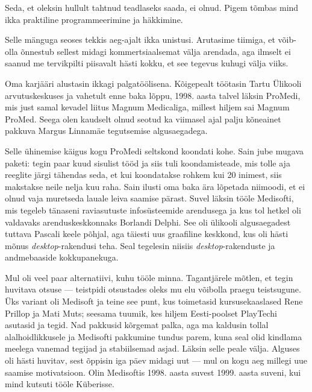 
Seda, et oleksin hullult tahtnud teadlaseks saada, ei olnud. Pigem tõmbas mind ikka
praktiline programmeerimine ja häkkimine. 


Selle mänguga seoses tekkis aeg-ajalt ikka unistusi. Arutasime tiimiga, et võib-olla õnnestub sellest midagi kommertsiaalsemat 
välja arendada, 
aga ilmselt ei saanud me tervikpilti piisavalt hästi 
kokku, et see tegevus kuhugi välja 
viiks. 

Oma karjääri alustasin ikkagi palgatöölisena. Kõigepealt töötasin Tartu Ülikooli arvutuskeskuses ja
vahetult enne baka lõppu, 1998. aasta talvel läksin
ProMedi, mis just samal kevadel liitus Magnum 
Medicaliga, millest hiljem sai Magnum ProMed. Seega
olen kaudselt olnud seotud ka viimasel ajal palju kõneainet pakkuva 
Margus Linnamäe tegutsemise algusaegadega. 

Selle ühinemise käigus kogu ProMedi seltskond koondati kohe. 
Sain jube mugava paketi: tegin paar kuud sisulist tööd ja siis tuli 
koondamisteade, mis tolle aja reeglite järgi tähendas seda, et kui koondatakse 
rohkem kui 20 inimest, siis makstakse neile nelja kuu raha. Sain ilusti 
oma baka ära lõpetada niimoodi, et ei olnud vaja 
muretseda lauale leiva saamise pärast. Suvel läksin tööle
Medisofti, mis tegeleb tänaseni raviasutuste 
infosüsteemide arendusega ja kus tol hetkel oli valdavaks arenduskeskkonnaks 
Borlandi Delphi. See oli ülikooli algusaegadest 
tuttava Pascali keele põhjal, aga täiesti uus graafiline keskkond, kus oli hästi mõnus 
\emph{desktop}-rakendusi teha. Seal tegelesin niisiis
\emph{desktop}-rakenduste ja andmebaaside kokkupanekuga. 

Mul oli veel paar alternatiivi, kuhu tööle 
minna. Tagantjärele mõtlen, et tegin huvitava otsuse --- 
teistpidi otsustades oleks mu elu võibolla praegu teistsugune. Üks variant oli Medisoft ja teine see punt, kus toimetasid kursusekaaslased Rene Prillop 
ja Mati Muts; seesama 
tuumik, kes hiljem Eesti-poolset PlayTechi asutasid ja 
tegid. Nad pakkusid kõrgemat palka, aga ma kaldusin tollal
alalhoidlikkusele ja Medisofti pakkumine tundus parem, kuna seal olid kindlama meelega
vanemad tegijad ja stabiilsemad asjad. Läksin 
selle peale välja. Alguses oli hästi huvitav, sest õppisin
iga päev midagi uut --- mul on kogu aeg millegi uue saamise 
motivatsioon. Olin Medisoftis 1998. aasta suvest 1999. aasta suveni, 
kui mind kutsuti tööle Küberisse. 

